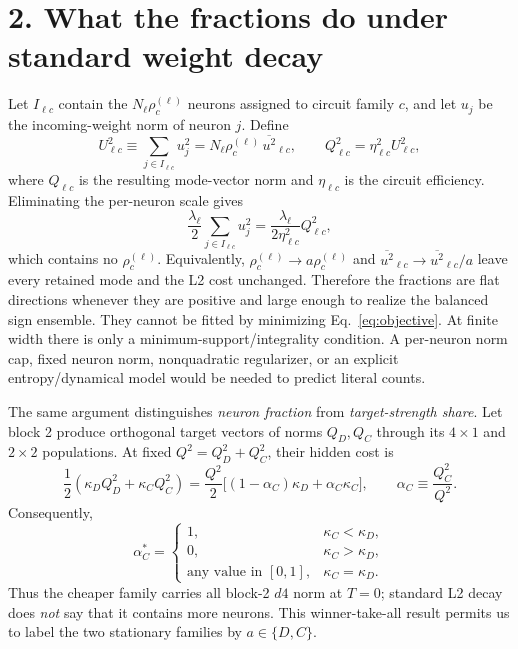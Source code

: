 \documentclass[10pt]{article}
\begin{document}
\section*{2. What the fractions do under standard weight decay}
Let $I_{\ell c}$ contain the $N_\ell\rho^{(\ell)}_c$ neurons assigned to circuit family $c$,
and let $u_j$ be the incoming-weight norm of neuron $j$.  Define
\begin{equation}
U_{\ell c}^2\equiv\sum_{j\in I_{\ell c}}u_j^2
=N_\ell\rho^{(\ell)}_c\,\overline{u^2}_{\ell c},
\qquad Q_{\ell c}^2=\eta_{\ell c}^2U_{\ell c}^2,
\label{eq:population-norm}
\end{equation}
where $Q_{\ell c}$ is the resulting mode-vector norm and $\eta_{\ell c}$ is the circuit
efficiency.  Eliminating the per-neuron scale gives
\begin{equation}
\frac{\lambda_\ell}{2}\sum_{j\in I_{\ell c}}u_j^2
=\frac{\lambda_\ell}{2\eta_{\ell c}^2}Q_{\ell c}^2,
\label{eq:fraction-cancels}
\end{equation}
which contains no $\rho^{(\ell)}_c$.  Equivalently,
$\rho^{(\ell)}_c\to a\rho^{(\ell)}_c$ and
$\overline{u^2}_{\ell c}\to\overline{u^2}_{\ell c}/a$ leave every retained mode and the L2
cost unchanged.  Therefore the fractions are flat directions whenever they are positive and
large enough to realize the balanced sign ensemble.  They cannot be fitted by minimizing
Eq.~\eqref{eq:objective}.  At finite width there is only a minimum-support/integrality
condition.  A per-neuron norm cap, fixed neuron norm, nonquadratic regularizer, or an explicit
entropy/dynamical model would be needed to predict literal counts.

The same argument distinguishes \emph{neuron fraction} from \emph{target-strength share}.
Let block 2 produce orthogonal target vectors of norms $Q_D,Q_C$ through its $4\times1$ and
$2\times2$ populations.  At fixed $Q^2=Q_D^2+Q_C^2$, their hidden cost is
\begin{equation}
\frac12(\kappa_DQ_D^2+\kappa_CQ_C^2)
=\frac{Q^2}{2}\big[(1-\alpha_C)\kappa_D+\alpha_C\kappa_C\big],
\qquad \alpha_C\equiv\frac{Q_C^2}{Q^2}.
\label{eq:strength-share}
\end{equation}
Consequently,
\begin{equation}
\alpha_C^*=\begin{cases}1,&\kappa_C<\kappa_D,\\0,&\kappa_C>\kappa_D,\\
\text{any value in }[0,1],&\kappa_C=\kappa_D.\end{cases}
\label{eq:winner-take-all}
\end{equation}
Thus the cheaper family carries all block-2 $d4$ norm at $T=0$; standard L2 decay does
\emph{not} say that it contains more neurons.  This winner-take-all result permits us to label
the two stationary families by $a\in\{D,C\}$.
\end{document}
